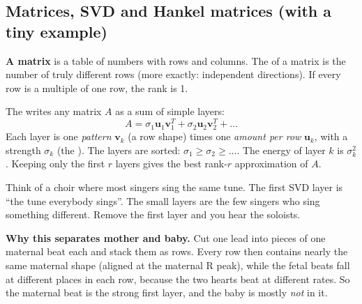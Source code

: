 \documentclass[11pt]{article}
\begin{document}
\subsection{Matrices, SVD and Hankel matrices (with a tiny example)}

\textbf{A matrix} is a table of numbers with rows and columns. The  of a matrix is the number of truly different rows (more exactly: independent directions). If every row is a multiple of one row, the rank is 1.

\begin{simple}
The  writes any matrix $A$ as a sum of simple layers:
\[
  A = \sigma_1 \mathbf{u}_1 \mathbf{v}_1^T + \sigma_2 \mathbf{u}_2 \mathbf{v}_2^T + \dots
\]
Each layer is one \emph{pattern} $\mathbf{v}_k$ (a row shape) times one \emph{amount per row} $\mathbf{u}_k$, with a strength $\sigma_k$ (the ). The layers are sorted: $\sigma_1 \ge \sigma_2 \ge \dots$. The energy of layer $k$ is $\sigma_k^2$. Keeping only the first $r$ layers gives the best rank-$r$ approximation of $A$.
\end{simple}

\begin{analogy}
Think of a choir where most singers sing the same tune. The first SVD layer is ``the tune everybody sings''. The small layers are the few singers who sing something different. Remove the first layer and you hear the soloists.
\end{analogy}

\textbf{Why this separates mother and baby.} Cut one lead into pieces of one maternal beat each and stack them as rows. Every row then contains nearly the same maternal shape (aligned at the maternal R peak), while the fetal beats fall at different places in each row, because the two hearts beat at different rates. So the maternal beat is the strong first layer, and the baby is mostly \emph{not} in it.
\end{document}
